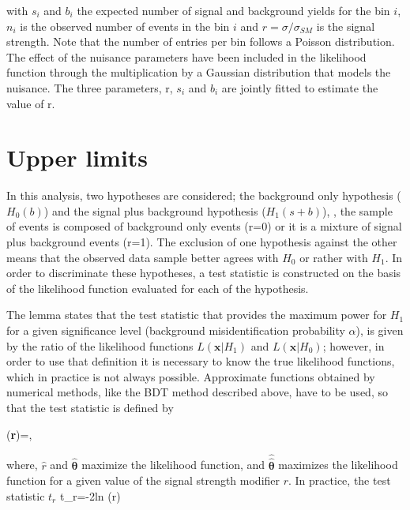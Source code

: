 \noindent with $s_i$ and $b_i$ the expected number of signal and background yields for the bin $i$, $n_i$ is the observed number of events in the bin $i$ and $r = \sigma/\sigma_{SM}$ is the signal strength. Note that the number of entries per bin follows a Poisson distribution. The effect of the nuisance parameters have been included in the likelihood function through the multiplication by a Gaussian distribution that models the nuisance. The three parameters, r, $s_i$ and $b_i$ are jointly fitted to estimate the value of r.


\section{Upper limits }

In this analysis, two hypotheses are considered; the background only hypothesis ($H_0(b)$) and the signal plus background hypothesis ($H_1(s+b)$), \ie, the sample of events is composed of background only events (r=0) or it is a mixture of signal plus background events (r=1). The exclusion of one hypothesis against the other means that the observed data sample better agrees with $H_0$ or rather with $H_1$. In order to discriminate these hypotheses, a test statistic is constructed on the basis of the likelihood function evaluated for each of the hypothesis.  

The  lemma \cite{npl} states that the test statistic that provides the maximum power for $H_1$ for a given significance level (background misidentification probability $\alpha$), is given by the ratio of the likelihood functions $L(\textbf{x}|H_1)$ and $L(\textbf{x}|H_0)$; however, in order to use that definition it is necessary to know the true likelihood functions, which in practice is not always possible. Approximate functions obtained by numerical methods, like the BDT method described above, have to be used, so that the  test statistic is defined by 

\beqn
\lambda(\textbf{r})=,
\eeqn

\noindent where, $\hat r$ and $\hat{\bm{\theta}}$ maximize the likelihood function, and $\hat{\hat{\bm{\theta}}}$ maximizes the likelihood function for a given value of the signal strength modifier $r$. In practice, the test statistic $t_r$
\beqn
t_r=-2\textrm{ln} \lambda(r)  
\eeqn

